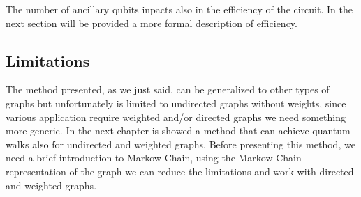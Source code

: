 The number of ancillary qubits inpacts also in the efficiency of the circuit. In the next
section will be provided a more formal description of efficiency.

\subsection{Limitations}

The method presented, as we just said, can be generalized to other types of graphs but unfortunately is limited to undirected graphs
without weights, since various application require weighted and/or directed graphs we need something more generic. In the next chapter
is showed a method that can achieve quantum walks also for undirected and weighted graphs. Before presenting this method, we need a 
brief introduction to Markow Chain, using the Markow Chain representation of the graph we can reduce the limitations and work with 
directed and weighted graphs.